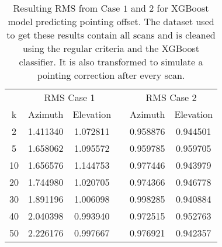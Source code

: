 \begin{table}[h]
    \centering %
    \caption{Resulting RMS from Case $1$ and $2$ for XGBoost model predicting pointing offset.
    The dataset used to get these results contain all scans and is cleaned using the regular criteria and the XGBoost classifier.
    It is also transformed to simulate a pointing correction after every scan.}
    \begin{tabular}{ccc c cc}
        \toprule
        \multicolumn{1}{c}{} & \multicolumn{2}{c}{RMS Case 1} & & \multicolumn{2}{c}{RMS Case 2} \\
        \cmidrule(lr){2-3} \cmidrule(lr){5-6}
        k & Azimuth & Elevation & & Azimuth & Elevation \\
        \midrule
        2 &  1.411340 &  1.072811 & &  0.958876 &  0.944501 \\
        5 &  1.658062 &  1.095572 & &  0.959785 &  0.959705 \\
       10 &  1.656576 &  1.144753 & &  0.977446 &  0.943979 \\
       20 &  1.744980 &  1.020705 & &  0.974366 &  0.946778 \\
       30 &  1.891196 &  1.006098 & &  0.998285 &  0.940884 \\
       40 &  2.040398 &  0.993940 & &  0.972515 &  0.952763 \\
       50 &  2.226176 &  0.997667 & &  0.976921 &  0.942357 \\
    \bottomrule
\end{tabular}
\end{table}
